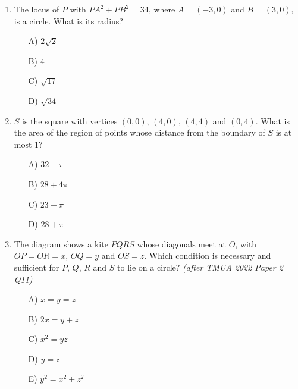 \documentclass[11pt,a4paper]{article}
\begin{document}
\begin{enumerate}

\item The locus of $P$ with $PA^2+PB^2=34$, where $A=(-3,0)$ and $B=(3,0)$, is a circle. What is its radius?
\begin{itemize}
\item[A)] $2\sqrt2$
\item[B)] $4$
\item[C)] $\sqrt{17}$
\item[D)] $\sqrt{34}$
\end{itemize}

\item $S$ is the square with vertices $(0,0)$, $(4,0)$, $(4,4)$ and $(0,4)$. What is the area of the region of points whose distance from the boundary of $S$ is at most $1$?
\begin{itemize}
\item[A)] $32+\pi$
\item[B)] $28+4\pi$
\item[C)] $23+\pi$
\item[D)] $28+\pi$
\end{itemize}

\item \begin{minipage}[t]{0.66\linewidth}
The diagram shows a kite $PQRS$ whose diagonals meet at $O$, with $OP=OR=x$, $OQ=y$ and $OS=z$. Which condition is necessary and sufficient for $P$, $Q$, $R$ and $S$ to lie on a circle? \textit{\small(after TMUA 2022 Paper 2 Q11)}
\begin{itemize}
\item[A)] $x=y=z$
\item[B)] $2x=y+z$
\item[C)] $x^2=yz$
\item[D)] $y=z$
\item[E)] $y^2=x^2+z^2$
\end{itemize}
\end{minipage}\hfill
\begin{minipage}[t]{0.30\linewidth}
\vspace{0pt}
\centering
{}
\end{minipage}


\end{enumerate}
\end{document}

